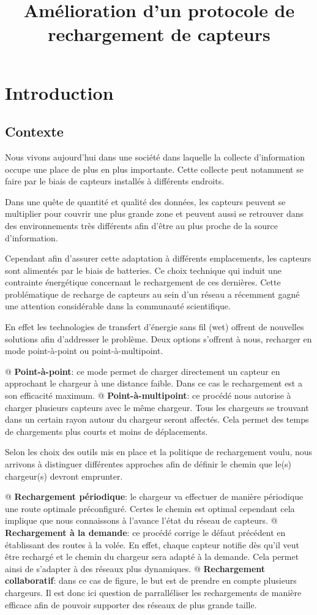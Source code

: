 \documentclass[noposter]{polytech}
\title{Amélioration d'un protocole de rechargement de capteurs}
\begin{document}
\chapter{Introduction}
	\section{Contexte}
		Nous vivons aujourd'hui dans une société dans laquelle la collecte d'information occupe une place de plus en plus importante.
		Cette collecte peut notamment se faire par le biais de capteurs installés à différents endroits.
		
		
		Dans une quête de quantité et qualité des données, les capteurs peuvent se multiplier pour couvrir une plus grande zone et peuvent aussi se retrouver dans des environnements très différents afin d'être au plus proche de la source d'information.
		
		Cependant afin d'assurer cette adaptation à différents emplacements, les capteurs sont alimentés par le biais de batteries. 
		Ce choix technique qui induit une contrainte énergétique concernant le rechargement de ces dernières.
		Cette problématique de recharge de capteurs au sein d'un réseau a récemment gagné une attention considérable dans la communauté scientifique.
		
		En effet les technologies de transfert d'énergie sans fil (\gls{wet}) offrent de nouvelles solutions afin d'addresser le problème.
		Deux options s'offrent à nous, recharger en mode point-à-point ou point-à-multipoint.
		\begin{easylist}[itemize]
			@ \textbf{Point-à-point}: ce mode permet de charger directement un capteur en approchant le chargeur à une distance faible.
			Dans ce cas le rechargement est a son efficacité maximum.
			@ \textbf{Point-à-multipoint}: ce procédé nous autorise à charger plusieurs capteurs avec le même chargeur.
			Tous les chargeurs se trouvant dans un certain rayon autour du chargeur seront affectés.
			Cela permet des temps de chargements plus courts et moins de déplacements.
		\end{easylist}
	
		Selon les choix des outils mis en place et la politique de rechargement voulu, nous arrivons à distinguer différentes approches afin de définir le chemin que le(s) chargeur(s) devront emprunter.
		\begin{easylist}[itemize]
			@ \textbf{Rechargement périodique}: le chargeur va effectuer de manière périodique une route optimale préconfiguré.
			Certes le chemin est optimal cependant cela implique que nous connaissons à l'avance l'état du réseau de capteurs.
			@ \textbf{Rechargement à la demande}: ce procédé corrige le défaut précédent en établissant des routes à la volée.
			En effet, chaque capteur notifie dès qu'il veut être rechargé et le chemin du chargeur sera adapté à la demande.
			Cela permet ainsi de s'adapter à des réseaux plus dynamiques.
			@ \textbf{Rechargement collaboratif}: dans ce cas de figure, le but est de prendre en compte plusieurs chargeurs.
			Il est donc ici question de parralléliser les rechargements de manière efficace afin de pouvoir supporter des réseaux de plus grande taille. 
		\end{easylist}
	
\end{document}
